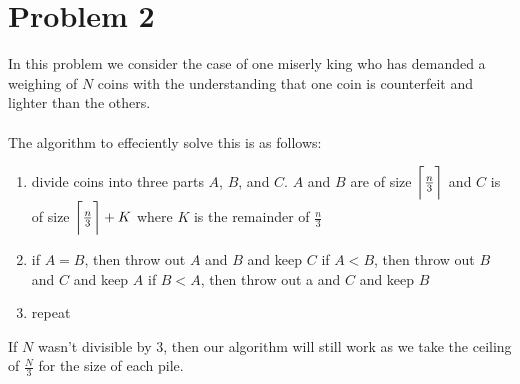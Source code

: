 \section*{Problem 2}

In this problem we consider the case of one miserly king who has 
demanded a weighing of $N$ coins with the understanding that one coin
is counterfeit and lighter than the others. 
\\
\\
The algorithm to effeciently solve this is as follows:
\begin{enumerate}[noitemsep]
    \item divide coins into three parts $A$, $B$, and $C$. $A$ and $B$ 
          are of size $\ceil[\bigg]{\frac{n}{3}}$ and $C$ is of size 
          $\ceil[\bigg]{\frac{n}{3}} + K$ where $K$ is the remainder 
          of $\frac{n}{3}$
    \item 
    \subitem if $A = B$,  then throw out $A$ and $B$ and keep $C$
    \subitem if $A < B$, then throw out $B$ and $C$ and keep $A$
    \subitem if $B < A$, then throw out a and $C$ and keep $B$
    \item repeat
\end{enumerate} 

If $N$ wasn't divisible by 3, then our algorithm will still work as we 
take the ceiling of $\frac{N}{3}$ for the size of each pile.
